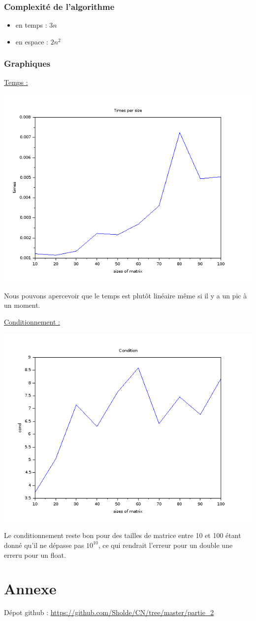 \documentclass{article}
\begin{document}
\subsubsection*{Complexité de l'algorithme}

\begin{itemize}
\item en temps : $3n$
\item en espace : $2n^2$
\end{itemize}

\subsubsection*{Graphiques}

\underline{Temps :}

\includegraphics[scale=0.5]{img/lu_times.png}

Nous pouvons apercevoir que le temps est plutôt linéaire même si il y
a un pic à un moment.

\underline{Conditionnement :}

\includegraphics[scale=0.5]{img/lu_cond.png}

Le conditionnement reste bon pour des tailles de matrice entre 10 et
100 étant donné qu'il ne dépasse pas $10^{10}$, ce qui rendrait l'erreur
pour un double une erreru pour un float.

\section*{Annexe}

Dépot github : \url{https://github.com/Sholde/CN/tree/master/partie_2}
\end{document}

